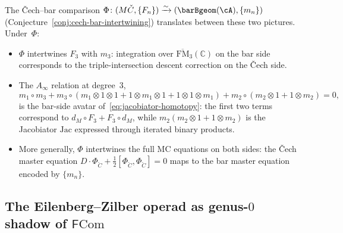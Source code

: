 The \v{C}ech--bar comparison
$\Phi\colon (M\check{C},\{F_n\}) \xrightarrow{\sim}
(\barBgeom(\cA),\{m_n\})$
(Conjecture~\ref{conj:cech-bar-intertwining}) translates between
these two pictures. Under~$\Phi$:
\begin{itemize}
\item $\Phi$ intertwines $F_3$ with $m_3$: integration over
 $\overline{\mathrm{FM}}_3(\mathbb{C})$ on the bar side
 corresponds to the triple-intersection descent correction on the
 \v{C}ech side.
\item The $A_\infty$ relation at degree~$3$,
\[
m_1 \circ m_3 + m_3 \circ (m_1 \otimes 1 \otimes 1
 + 1 \otimes m_1 \otimes 1 + 1 \otimes 1 \otimes m_1)
+ m_2 \circ (m_2 \otimes 1 + 1 \otimes m_2) = 0,
\]
is the bar-side avatar of~\eqref{eq:jacobiator-homotopy}:
the first two terms correspond to
$d_M \circ F_3 + F_3 \circ d_M$,
while $m_2(m_2 \otimes 1 + 1 \otimes m_2)$ is the Jacobiator
$\mathrm{Jac}$ expressed through iterated binary products.
\item More generally, $\Phi$ intertwines the full MC equations on
 both sides: the \v{C}ech master equation
 $D \cdot \Phi_{\check{C}} + \tfrac{1}{2}
 [\Phi_{\check{C}},\Phi_{\check{C}}] = 0$ maps to
 the bar master equation encoded by $\{m_n\}$.
\end{itemize}

\subsection{The Eilenberg--Zilber operad as genus-$0$ shadow of
$\mathsf{F}\mathrm{Com}$}
\label{subsec:ez-fcom}

